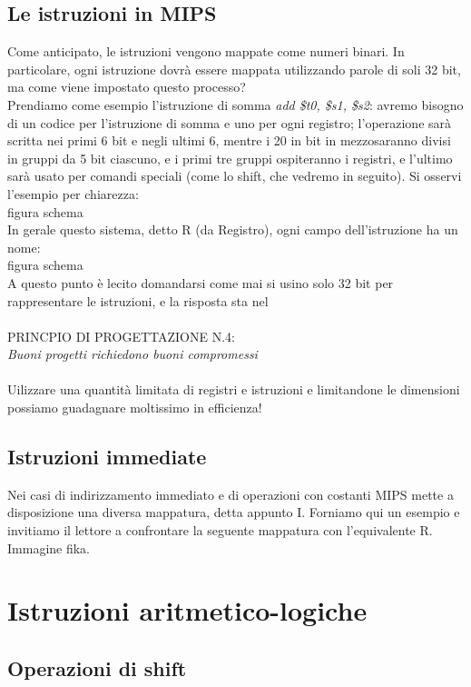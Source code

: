 \documentclass[class=book, crop=false]{standalone}
\begin{document}
\subsection{Le istruzioni in MIPS}
Come anticipato, le istruzioni vengono mappate come numeri binari. In particolare, ogni istruzione dovrà essere mappata utilizzando parole di soli 32 bit, ma come viene impostato questo processo?\\
Prendiamo come esempio l'istruzione di somma \emph{add \$t0, \$s1, \$s2}: avremo bisogno di un codice per l'istruzione di somma e uno per ogni registro; l'operazione sarà scritta nei primi 6 bit e negli ultimi 6, mentre i 20 in bit in mezzosaranno divisi in gruppi da 5 bit ciascuno, e i primi tre gruppi ospiteranno i registri, e l'ultimo sarà usato per comandi speciali (come lo shift, che vedremo in seguito). Si osservi l'esempio per chiarezza:\\
figura schema\\
In gerale questo sistema, detto R (da Registro), ogni campo dell'istruzione ha un nome:\\
figura schema\\
A questo punto è lecito domandarsi come mai si usino solo 32 bit per rappresentare le istruzioni, e la risposta sta nel\\\\
PRINCPIO DI PROGETTAZIONE N.4:\\\textit{Buoni progetti richiedono buoni compromessi}\\\\
Uilizzare una quantità limitata di registri e istruzioni e limitandone le dimensioni possiamo guadagnare moltissimo in efficienza!

\subsection{Istruzioni immediate}
Nei casi di indirizzamento immediato e di operazioni con costanti MIPS mette a disposizione una diversa mappatura, detta appunto I. Forniamo qui un esempio e invitiamo il lettore a confrontare la seguente mappatura con l'equivalente R.\\
Immagine fika.


\section{Istruzioni aritmetico-logiche}

\subsection{Operazioni di shift}
\end{document}
